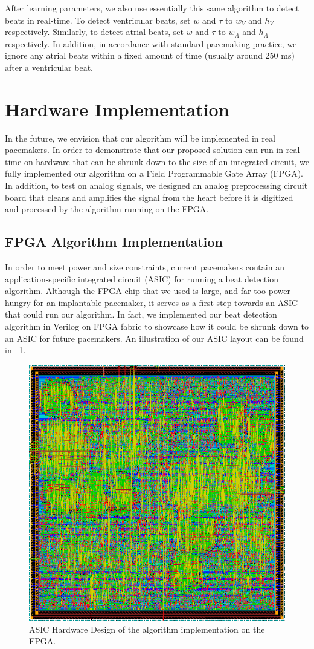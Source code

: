 \documentclass[conference]{IEEEtran}
\newcommand{\APW}{\ensuremath{w_A}}
\newcommand{\VPW}{\ensuremath{w_V}}
\newcommand{\APH}{\ensuremath{h_A}}
\newcommand{\VPH}{\ensuremath{h_V}}
\begin{document}
After learning parameters, we also use essentially this same algorithm to detect beats in real-time.
To detect ventricular beats, set $w$ and $\tau$ to \VPW{} and \VPH{} respectively.
Similarly, to detect atrial beats, set $w$ and $\tau$ to \APW{} and \APH{} respectively.
In addition, in accordance with standard pacemaking practice, we ignore any atrial beats within a fixed amount of time (usually around 250 ms) after
a ventricular beat.

\section{Hardware Implementation}
In the future, we envision that our algorithm will be
implemented in real pacemakers. In order to
demonstrate that our proposed solution can run in
real-time on hardware that can be shrunk down to
the size of an integrated circuit, we fully implemented
our algorithm on a Field Programmable Gate Array
(FPGA).
In addition, to test on analog signals, we
designed an analog preprocessing circuit board that cleans and
amplifies the signal from the heart before it is digitized and processed
by the algorithm running on the FPGA.

\subsection{FPGA Algorithm Implementation}
In order to meet power and size constraints, 
current pacemakers contain an application-specific integrated circuit (ASIC) for running a beat detection algorithm.
Although the FPGA chip that we used is large, and far too power-hungry for an implantable pacemaker,
it serves as a first step towards an ASIC that could run our algorithm.
In fact, we implemented our beat detection algorithm in Verilog on FPGA fabric to
showcase how it could be shrunk down to an ASIC for future pacemakers.
An illustration of our ASIC
layout can be found in \figurename~\ref{fig:fpga}.
\begin{figure}[h]
	\centering
	\includegraphics[width=.7\columnwidth]{fpga.png}
	\caption{ASIC Hardware Design of the algorithm implementation on the FPGA.}
	\label{fig:fpga}
\end{figure}
\end{document}
